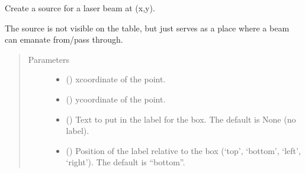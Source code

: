 \documentclass[letterpaper,10pt,english]{sphinxmanual}
\begin{document}
\begin{fulllineitems}
\begin{fulllineitems}
\end{fulllineitems}


\begin{fulllineitems}
\label{\detokenize{index:pyopticaltable.OpticalTable.point_source}}
\sphinxAtStartPar
Create a source for a laser beam at (x,y).

\sphinxAtStartPar
The source is not visible on the table, but just serves as a place where
a beam can emanate from/pass through.
\begin{quote}\begin{description}
\item[{Parameters}] \leavevmode\begin{itemize}
\item {} 
\sphinxAtStartPar
{} () \textendash{} x\sphinxhyphen{}coordinate of the point.

\item {} 
\sphinxAtStartPar
{} () \textendash{} y\sphinxhyphen{}coordinate of the point.

\item {} 
\sphinxAtStartPar
{} (\sphinxstyleliteralemphasis{\sphinxupquote{, }}) \textendash{} Text to put in the label for the box. The default is None (no label).

\item {} 
\sphinxAtStartPar
{} (\sphinxstyleliteralemphasis{\sphinxupquote{, }}) \textendash{} Position of the label relative to the box (‘top’, ‘bottom’, ‘left’, ‘right’).
The default is “bottom”.


\end{itemize}
\end{description}
\end{quote}
\end{fulllineitems}
\end{fulllineitems}
\end{document}
